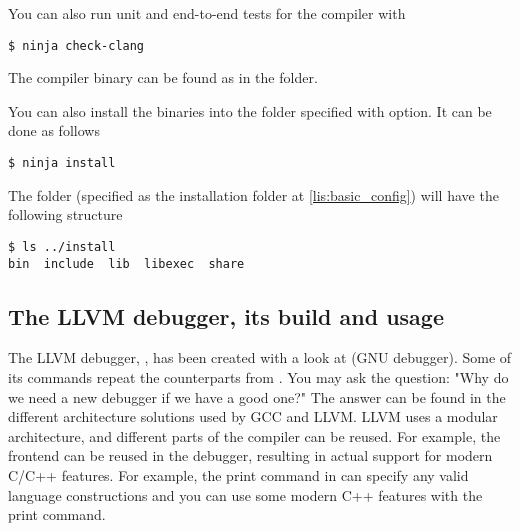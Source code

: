 You can also run unit and end-to-end tests for the compiler with
\begin{adjustwidth}{0em}{0em}
\begin{verbatim}
$ ninja check-clang
\end{verbatim}
\end{adjustwidth}
The compiler binary can be found as  in the 
folder.  



You can also install the binaries into the folder specified with
 option. It can be done as follows
\begin{adjustwidth}{0em}{0em}
\begin{verbatim}
$ ninja install
\end{verbatim}
\end{adjustwidth}
The folder  (specified as the installation folder at
\cref{lis:basic_config}) 
will have the following structure
\begin{adjustwidth}{0em}{0em}
\begin{verbatim}
$ ls ../install
bin  include  lib  libexec  share
\end{verbatim}
\end{adjustwidth}

\subsection{The LLVM debugger, its build and usage}
The LLVM debugger, \lldb, has been created with a look at
\gdb (GNU debugger). Some of its commands repeat the counterparts from
\gdb. You may ask the question: "Why do we need a new debugger if we
have a good one?" The answer can be found in the different architecture
solutions used by GCC and LLVM. LLVM uses a modular architecture, and different
parts of the compiler can be reused. For example, the \clang frontend can be
reused in the debugger, resulting in actual support for modern C/C++
features. For example, the print command in  can specify any valid
language constructions and you can use some modern C++ features with the
 print command. 

